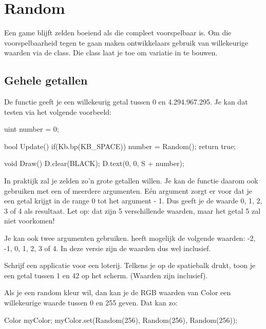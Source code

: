\chapter{Random}
Een game blijft zelden boeiend als die compleet voorspelbaar is. Om die voorspelbaarheid tegen te gaan maken ontwikkelaars gebruik van willekeurige waarden via de  class. Die class laat je toe om variatie in te bouwen. 

\section{Gehele getallen}
De functie  geeft je een willekeurig getal tussen 0 en 4.294.967.295. Je kan dat testen via het volgende voorbeeld:

\begin{code}
uint number = 0;

bool Update() {
  if(Kb.bp(KB_SPACE)) number = Random();
	return true;
}

void Draw() {
	D.clear(BLACK);
	D.text(0, 0, S + number);
}
\end{code}

In praktijk zal je zelden zo'n grote getallen willen. Je kan de functie  daarom ook gebruiken met een of meerdere argumenten. E\'en argument zorgt er voor dat je een getal krijgt in de range 0 tot het argument - 1. Dus  geeft je de waarde 0, 1, 2, 3 of 4 als resultaat. Let op: dat zijn 5 verschillende waarden, maar het getal 5 zal niet voorkomen!

Je kan ook twee argumenten gebruiken.  heeft mogelijk de volgende waarden: -2, -1, 0, 1, 2, 3 of 4. In deze versie zijn de waarden dus wel inclusief.

\begin{exercise}
Schrijf een applicatie voor een loterij. Telkens je op de spatiebalk drukt, toon je een getal tussen 1 en 42 op het scherm. (Waarden zijn inclusief).
\end{exercise}

\begin{note}
Als je een random kleur wil, dan kan je de RGB waarden van Color een willekeurige waarde tussen 0 en 255 geven. Dat kan zo:

\begin{code}
Color myColor;
myColor.set(Random(256), Random(256), Random(256));
\end{code}
\end{note}

